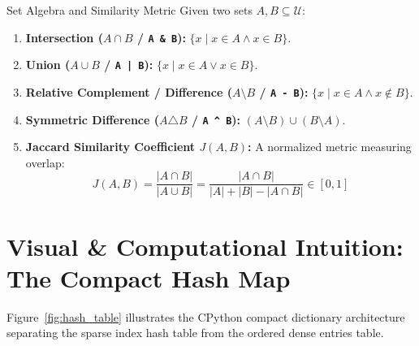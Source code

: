 \begin{definitionbox}{Set Algebra and Similarity Metric}
 
Given two sets $A, B \subseteq \mathcal{U}$:
\begin{enumerate}
    \item \textbf{Intersection ($A \cap B$ / \texttt{A \& B}):} $\{x \mid x \in A \land x \in B\}$.
    \item \textbf{Union ($A \cup B$ / \texttt{A | B}):} $\{x \mid x \in A \lor x \in B\}$.
    \item \textbf{Relative Complement / Difference ($A \setminus B$ / \texttt{A - B}):} $\{x \mid x \in A \land x \notin B\}$.
    \item \textbf{Symmetric Difference ($A \triangle B$ / \texttt{A \^{} B}):} $(A \setminus B) \cup (B \setminus A)$.
    \item \textbf{Jaccard Similarity Coefficient $J(A, B)$:} A normalized metric measuring overlap:
    \begin{equation}
    J(A, B) = \frac{|A \cap B|}{|A \cup B|} = \frac{|A \cap B|}{|A| + |B| - |A \cap B|} \in [0, 1]
    \end{equation}
\end{enumerate}
\end{definitionbox}

\section{Visual \& Computational Intuition: The Compact Hash Map}

Figure~\ref{fig:hash_table} illustrates the CPython compact dictionary architecture separating the sparse index hash table from the ordered dense entries table.

